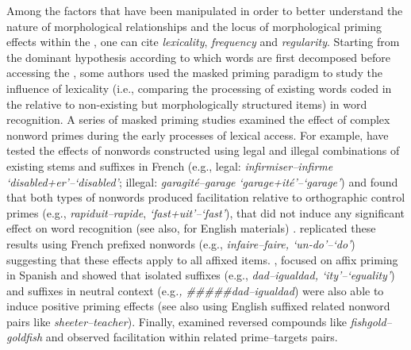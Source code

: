 \documentclass[output=paper]{langsci/langscibook}
\begin{document}
Among the factors that have been manipulated in order to better
understand the nature of morphological relationships and the locus of
morphological priming effects within the , one can cite
\emph{lexicality}, \emph{frequency} and \emph{regularity}. Starting from
the dominant hypothesis according to which words are first decomposed
before accessing the , some authors used the masked
priming paradigm to study the influence of lexicality (i.e., comparing
the processing of existing words coded in the  relative to
non-existing but morphologically structured items) in word recognition.
A series of masked priming studies examined the effect of complex
nonword primes during the early processes of lexical access. For
example, %
\citet{LongtinMeunier2005} %
%
have tested the effects of nonwords
constructed using legal and illegal combinations of existing stems and suffixes
in French (e.g., legal: \emph{infirmiser--infirme
`disabled+er'--`disabled'}; illegal: \emph{garagité--garage}
\emph{`garage+ité'--`garage'}) and found that both types of nonwords
produced facilitation relative to orthographic control primes (e.g.,
\emph{rapiduit--rapide}, \emph{`fast+uit'--`fast'}), that did not induce
any significant effect on word recognition %
(see also, %
\citealt{McCormickRastleEtAl2009,MorrisGraingerHolcomb2013} %
 for English materials)%
%
%
. %
\citet{GiraudoVoga2013} %
%
replicated these results using
French prefixed nonwords (e.g., \emph{infaire--faire, `un-do'--`do'})
suggesting that these effects apply to all affixed items. %
%
\citet{AndoniDunabeitiaPereaEtAl2008}%
%
, focused on affix priming in Spanish and
showed that isolated suffixes (e.g., \emph{dad--igualdad,
`ity'--`eguality'}) and suffixes in neutral context (e.g\emph{.,
\#\#\#\#\#dad--igualdad}) were also able to induce positive priming
effects (see also %
\citealt{CrepaldiHemsworthAl2016} %
 using
English suffixed related nonword pairs like \emph{sheeter--teacher}).
Finally, %
\citet{CrepaldiRastleDavisLupker2013} %
%
examined reversed
compounds like \emph{fishgold--goldfish} and observed facilitation within
related prime--targets pairs.
\end{document}
